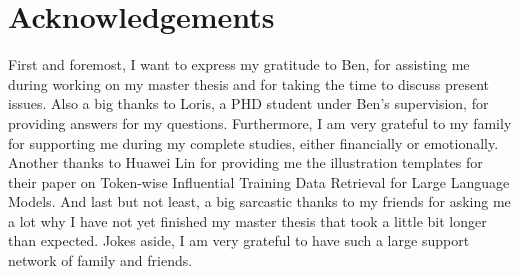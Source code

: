 \thispagestyle{empty}
\chapter{Acknowledgements}

First and foremost, I want to express my gratitude to Ben, for assisting me during working on my master thesis and for taking the time to discuss present issues. Also a big thanks to Loris, a PHD student under Ben's supervision, for providing answers for my questions. Furthermore, I am very grateful to my family for supporting me during my complete studies, either financially or emotionally. Another thanks to Huawei Lin for providing me the illustration templates for their paper on Token-wise Influential Training Data Retrieval for Large Language Models. And last but not least, a big sarcastic thanks to my friends for asking me a lot why I have not yet finished my master thesis that took a little bit longer than expected. Jokes aside, I am very grateful to have such a large support network of family and friends. 
\clearpage
